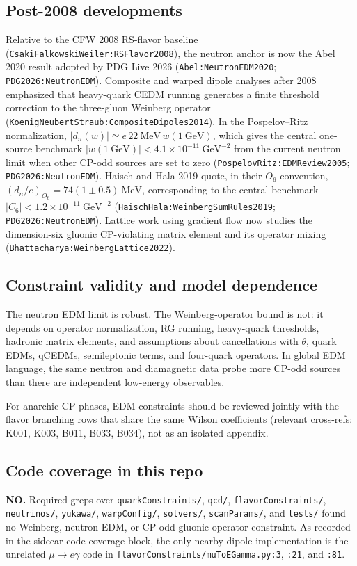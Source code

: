 \subsection*{Post-2008 developments}
Relative to the CFW 2008 RS-flavor baseline
(\texttt{CsakiFalkowskiWeiler:RSFlavor2008}), the neutron anchor is now the
Abel 2020 result adopted by PDG Live 2026
(\texttt{Abel:NeutronEDM2020}; \texttt{PDG2026:NeutronEDM}).  Composite and
warped dipole analyses after 2008 emphasized that heavy-quark CEDM running
generates a finite threshold correction to the three-gluon Weinberg operator
(\texttt{KoenigNeubertStraub:CompositeDipoles2014}).  In the Pospelov--Ritz
normalization,
\(|d_n(w)|\simeq e\,22~\mathrm{MeV}\,w(1~\mathrm{GeV})\), which gives the
central one-source benchmark
\(|w(1~\mathrm{GeV})|<4.1\times10^{-11}\ \mathrm{GeV}^{-2}\) from the current
neutron limit when other CP-odd sources are set to zero
(\texttt{PospelovRitz:EDMReview2005}; \texttt{PDG2026:NeutronEDM}).  Haisch
and Hala 2019 quote, in their \(O_6\) convention,
\((d_n/e)_{O_6}=74(1\pm0.5)~\mathrm{MeV}\), corresponding to the central
benchmark \(|C_6|<1.2\times10^{-11}\ \mathrm{GeV}^{-2}\)
(\texttt{HaischHala:WeinbergSumRules2019}; \texttt{PDG2026:NeutronEDM}).
Lattice work using gradient flow now studies the dimension-six gluonic
CP-violating matrix element and its operator mixing
(\texttt{Bhattacharya:WeinbergLattice2022}).

\subsection*{Constraint validity and model dependence}
The neutron EDM limit is robust.  The Weinberg-operator bound is not: it
depends on operator normalization, RG running, heavy-quark thresholds,
hadronic matrix elements, and assumptions about cancellations with
\(\bar\theta\), quark EDMs, qCEDMs, semileptonic terms, and four-quark
operators.  In global EDM language, the same neutron and diamagnetic data
probe more CP-odd sources than there are independent low-energy observables.

For anarchic CP phases, EDM constraints should be reviewed jointly with the
flavor branching rows that share the same Wilson coefficients (relevant
cross-refs: K001, K003, B011, B033, B034), not as an isolated appendix.

\subsection*{Code coverage in this repo}
\textbf{NO.}  Required greps over \texttt{quarkConstraints/}, \texttt{qcd/},
\texttt{flavorConstraints/}, \texttt{neutrinos/}, \texttt{yukawa/},
\texttt{warpConfig/}, \texttt{solvers/}, \texttt{scanParams/}, and
\texttt{tests/} found no Weinberg, neutron-EDM, or CP-odd gluonic operator
constraint.  As recorded in the sidecar code-coverage block, the only nearby
dipole implementation is the unrelated
\(\mu\to e\gamma\) code in \texttt{flavorConstraints/muToEGamma.py:3},
\texttt{:21}, and \texttt{:81}.


